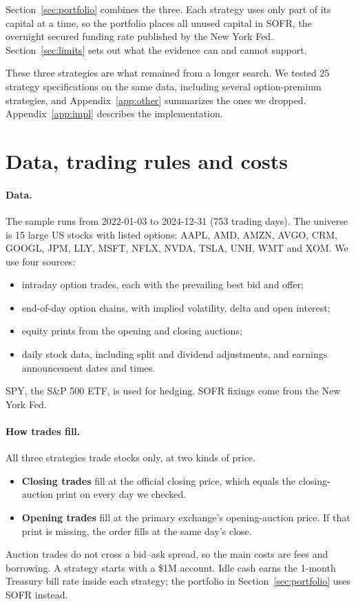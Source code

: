 \documentclass[11pt]{article}
\begin{document}
Section~\ref{sec:portfolio} combines the three. Each strategy uses only part of its capital at a time, so the portfolio places all unused capital in SOFR, the overnight secured funding rate published by the New York Fed. Section~\ref{sec:limits} sets out what the evidence can and cannot support.

These three strategies are what remained from a longer search. We tested 25 strategy specifications on the same data, including several option-premium strategies, and Appendix~\ref{app:other} summarizes the ones we dropped. Appendix~\ref{app:impl} describes the implementation.

\section{Data, trading rules and costs}\label{sec:data}

\paragraph{Data.} The sample runs from 2022-01-03 to 2024-12-31 (753 trading days). The universe is 15 large US stocks with listed options: AAPL, AMD, AMZN, AVGO, CRM, GOOGL, JPM, LLY, MSFT, NFLX, NVDA, TSLA, UNH, WMT and XOM. We use four sources:
\begin{itemize}
  \item intraday option trades, each with the prevailing best bid and offer;
  \item end-of-day option chains, with implied volatility, delta and open interest;
  \item equity prints from the opening and closing auctions;
  \item daily stock data, including split and dividend adjustments, and earnings announcement dates and times.
\end{itemize}
SPY, the S\&P 500 ETF, is used for hedging. SOFR fixings come from the New York Fed.

\paragraph{How trades fill.} All three strategies trade stocks only, at two kinds of price.
\begin{itemize}
  \item \textbf{Closing trades} fill at the official closing price, which equals the closing-auction print on every day we checked.
  \item \textbf{Opening trades} fill at the primary exchange's opening-auction price. If that print is missing, the order fills at the same day's close.
\end{itemize}
Auction trades do not cross a bid--ask spread, so the main costs are fees and borrowing. A strategy starts with a \$1M account. Idle cash earns the 1-month Treasury bill rate inside each strategy; the portfolio in Section~\ref{sec:portfolio} uses SOFR instead.
\end{document}
